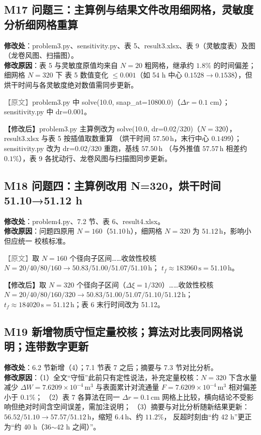 \documentclass[UTF8,zihao=-4]{ctexart}
\newcommand{\yuanduan}[1]{\par\noindent\textcolor{gray}{\small 【原文】}#1\par}
\newcommand{\xinduan}[1]{\par\noindent\textcolor{black}{\small 【修改后】}#1\par}
\begin{document}
\subsection*{M17 问题三：主算例与结果文件改用细网格，灵敏度分析细网格重算}

\textbf{修改处}：problem3.py、sensitivity.py、表 5、result3.xlsx、表 9（灵敏度表）及图（龙卷风图、扫描图）。\\
\textbf{修改原因}：表 5 与灵敏度原值均来自 $N=20$ 粗网格，继承约 $1.8\%$ 的时间偏差；细网格 $N=320$ 下
表 5 数值变化 $\le0.001$（如 54 h 中心 $0.1528\to0.1538$），但烘干时间与各灵敏度绝对数值需同步更新。

\yuanduan{problem3.py 中 solve(10.0, snap\_at=10800.0)（$\Delta r=0.1$ cm）；sensitivity.py 中 dr=0.001。}
\xinduan{problem3.py 主算例改为 solve(10.0, dr=0.02/320)（$N=320$），result3.xlsx 与表 5 按插值取数重算
（烘干时间 $57.50\,\mathrm{h}$，末行中心 $0.1499$）；sensitivity.py 改为 dr=0.02/320 重跑，基线 $57.50\,\mathrm{h}$
（与外推值 $57.57\,\mathrm{h}$ 相差约 $0.1\%$），表 9 各扰动行、龙卷风图与扫描图同步更新。}

\subsection*{M18 问题四：主算例改用 N=320，烘干时间 51.10→51.12 h}

\textbf{修改处}：problem4.py、7.2 节、表 6、result4.xlsx。\\
\textbf{修改原因}：问题四原用 $N=160$（$51.10\,\mathrm{h}$），细网格 $N=320$ 为 $51.12\,\mathrm{h}$，影响小但应统一
校核标准。

\yuanduan{取 $N=160$ 个径向子区间……收敛性校核 $N=20/40/80/160\to50.83/51.00/51.07/51.10\,\mathrm{h}$；
$t_f\approx183960\,\mathrm{s}=51.10\,\mathrm{h}$。}
\xinduan{取 $N=320$ 个径向子区间（$\Delta\xi=1/320$）……收敛性校核 $N=20/40/80/160/320\to
50.83/51.00/51.07/51.10/51.12\,\mathrm{h}$；$t_f\approx184020\,\mathrm{s}=51.12\,\mathrm{h}$；表 6 末行时间改为 51.12。}

\subsection*{M19 新增物质守恒定量校核；算法对比表同网格说明；连带数字更新}

\textbf{修改处}：6.2 节新增（4）；7.1 节表 7 之后；摘要与 7.3 节对比分析。\\
\textbf{修改原因}：（1）全文“守恒”此前只有定性说法，补充定量校核：$N=320$ 下含水量减少
$\Delta W=7.6209\times10^{-4}\,\mathrm{m^3}$ 与表面累计对流通量 $F=7.6209\times10^{-4}\,\mathrm{m^3}$ 相对偏差小于 $0.1\%$；
（2）表 7 各算法在同一 $\Delta r=0.1\,\mathrm{cm}$ 网格上比较，横向结论不受影响但绝对时间含空间误差，需加注说明；
（3）摘要与对比分析随新结果更新：$56.52/51.10\to57.57/51.12\,\mathrm{h}$，缩短 $6.4\,\mathrm{h}$、约 $11.2\%$，
反超时刻由“约 42 h”更正为“约 40 h（36$\sim$42 h 之间）”。
\end{document}

